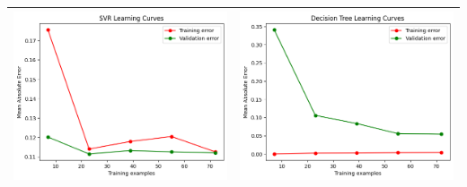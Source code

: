 \begin{table}[H]
    \centering
    \footnotesize
    \setlength\tabcolsep{0pt}
    \begin{tabularx}{\textwidth}{|X|X|}
        \hline
        \includegraphics[width=\linewidth, trim=0 0 0 0]{images/SVR_lc90_Azure.png} &
        \includegraphics[width=\linewidth, trim=0 0 0 0]{images/DecisionTree_lc90_Azure.png} \\
        \hline

\end{tabularx}
\end{table}
